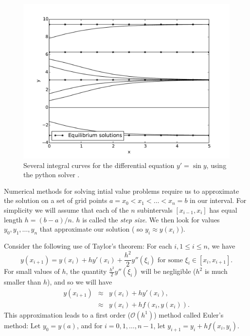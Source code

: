 \begin{figure}
\centering
\includegraphics[width=\textwidth]{Fig2.pdf}
\caption{Several integral curves for the differential equation $y' =\sin y$, using the python solver . }
\label{ivp:int_curves}
\end{figure}



Numerical methods for solving intial value problems require us to approximate the solution on a set of grid points $a = x_0< x_1<\hdots< x_n = b$ in our interval.  For simplicity we will assume that each of the $n$ subintervals $[x_{i-1},x_i]$ has equal length $h = (b-a)/n$. $h$ is called the \textit{step size}. We then look for values $y_0,y_1, \hdots, y_n$ that approximate our solution ( so $y_i \approx y(x_i)$).  

Consider the following use of Taylor's theorem: For each $i, 1 \leq i \leq n$, we have
\[
y(x_{i+1}) = y(x_{i}) + h y'(x_i) + \frac{h^2}{2} y''(\xi_i)\text{ for some }\xi_i \in [x_i,x_{i+1}].
\]
For small values of $h$, the quantity $\frac{h^2}{2} y''(\xi_i)$ will be negligible ($h^2$ is much smaller than $h$), and so we will have
\begin{eqnarray*}
y(x_{i+1}) &\approx& y(x_{i}) + h y'(x_i)  ,\\
&\approx & y(x_{i}) + h f(x_i,y(x_i)).
\end{eqnarray*}
This approximation leads to a first order ($\mathcal{O}(h^1)$) method called Euler's method: Let $y_0 = y(a)$, and for $i = 0, 1, \hdots, n-1$, let $y_{i+1} = y_i +hf(x_i,y_i)$. 

